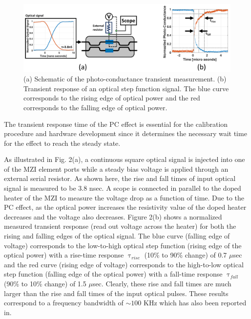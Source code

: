 \begin{figure}[b]
\vspace{-4mm}
\centering\includegraphics[scale=0.4]{Chapter5/fig2_trans_3}
\caption{(a) Schematic of the photo-conductance transient measurement. (b) Transient response of an optical step function signal. The blue curve corresponds to the rising edge of optical power and the red corresponds to the falling edge of optical power.}

\end{figure}

The transient response time of the PC effect is essential for the calibration procedure and hardware development since it determines the necessary wait time for the effect to reach the steady state. 

As illustrated in Fig. 2(a), a continuous square optical signal is injected into one of the MZI element ports while a steady bias voltage is applied through an external serial resistor. As shown here, the rise and fall times of input optical signal is measured to be 3.8 nsec. 
%
A scope is connected in parallel to the doped heater of the MZI to measure the voltage drop as a function of time. Due to the PC effect, as the optical power increases the resistivity value of the doped heater decreases and the voltage also decreases. Figure 2(b) shows a normalized measured transient response (read out voltage across the heater) for both the rising and falling edges of the optical signal. The blue curve (falling edge of voltage) corresponds to the low-to-high optical step function (rising edge of the optical power)  with a rise-time response $\uptau_{rise}$ (10\% to 90\% change) of 0.7 $\mu$sec and the red curve (rising edge of voltage) corresponds to the high-to-low optical step function (falling edge of the optical power) with a fall-time response $\uptau_{fall}$ (90\% to 10\% change) of 1.5 $\mu$sec. Clearly, these rise and fall times are much larger than the rise and fall times of the input optical pulses. These results correspond to a frequency bandwidth of $\sim100$ KHz which has also been reported in\cite{Dong_PC}.














